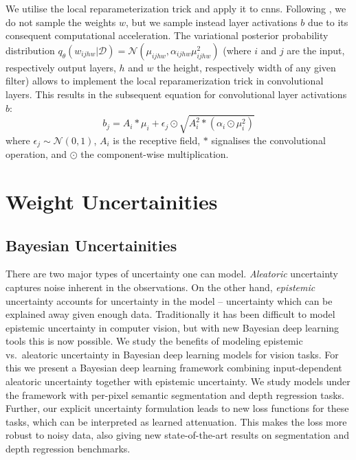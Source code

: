 We utilise the local reparameterization trick \cite{kingma2015variational} and apply it to \acp{cnn}. Following \cite{kingma2015variational,neklyudov2018variance}, we do not sample the weights $w$, but we sample instead layer activations $b$ due to its consequent computational acceleration. The variational posterior probability distribution $q_{\theta}(w_{ijhw}|\mathcal{D})=\mathcal{N}(\mu_{ijhw},\alpha_{ijhw}\mu^2_{ijhw})$ (where $i$ and $j$ are the input, respectively output layers, $h$ and $w$ the height, respectively width of any given filter) allows to implement the local reparamerization trick in convolutional layers. This results in the subsequent equation for convolutional layer activations $b$:
\begin{equation}
    b_j=A_i\ast \mu_i+\epsilon_j\odot \sqrt{A^2_i\ast (\alpha_i\odot \mu^2_i)}
\end{equation}
where $\epsilon_j \sim \mathcal{N}(0,1)$, $A_i$ is the receptive field, $\ast$ signalises the convolutional operation, and $\odot$ the component-wise multiplication.

\section{Weight Uncertainities}
\subsection{Bayesian Uncertainities}

There are two major types of uncertainty one can model. \textit{Aleatoric} uncertainty captures noise inherent in the observations. On the other hand, \textit{epistemic} uncertainty accounts for uncertainty in the model -- uncertainty which can be explained away given enough data. Traditionally it has been difficult to model epistemic uncertainty in computer vision, but with new Bayesian deep learning tools this is now possible.
We study the benefits of modeling epistemic vs.\ aleatoric uncertainty in Bayesian deep learning models for vision tasks. For this we present a Bayesian deep learning framework combining input-dependent aleatoric uncertainty together with epistemic uncertainty. We study models under the framework with per-pixel semantic segmentation and depth regression tasks. Further, our explicit uncertainty formulation leads to new loss functions for these tasks, which can be interpreted as learned attenuation. This makes the loss more robust to noisy data, also giving new state-of-the-art results on segmentation and depth regression benchmarks. 

